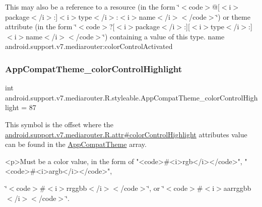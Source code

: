 This may also be a reference to a resource (in the form \char`\"{}$<$code$>$@\mbox{[}$<$i$>$package$<$/i$>$\+:\mbox{]}$<$i$>$type$<$/i$>$\+:$<$i$>$name$<$/i$>$$<$/code$>$\char`\"{}) or theme attribute (in the form \char`\"{}$<$code$>$?\mbox{[}$<$i$>$package$<$/i$>$\+:\mbox{]}\mbox{[}$<$i$>$type$<$/i$>$\+:\mbox{]}$<$i$>$name$<$/i$>$$<$/code$>$\char`\"{}) containing a value of this type.  name android.\+support.\+v7.\+mediarouter\+:color\+Control\+Activated \mbox{\label{classandroid_1_1support_1_1v7_1_1mediarouter_1_1R_1_1styleable_a3101d4c220b1624630e177adbcb5bed1}} 
\subsubsection{\texorpdfstring{App\+Compat\+Theme\+\_\+color\+Control\+Highlight}{AppCompatTheme\_colorControlHighlight}}
{\footnotesize\ttfamily int android.\+support.\+v7.\+mediarouter.\+R.\+styleable.\+App\+Compat\+Theme\+\_\+color\+Control\+Highlight = 87\hspace{0.3cm}{\ttfamily [static]}}

This symbol is the offset where the \hyperlink{classandroid_1_1support_1_1v7_1_1mediarouter_1_1R_1_1attr_abb07fa9a5eea7ae936cbd535a850d6e4}{android.\+support.\+v7.\+mediarouter.\+R.\+attr\#color\+Control\+Highlight} attribute\textquotesingle{}s value can be found in the \hyperlink{classandroid_1_1support_1_1v7_1_1mediarouter_1_1R_1_1styleable_a4e3d3900c75d49aeb2f283cac00214d6}{App\+Compat\+Theme} array.

\begin{DoxyVerb}      <p>Must be a color value, in the form of "<code>#<i>rgb</i></code>", "<code>#<i>argb</i></code>",
\end{DoxyVerb}
 \char`\"{}$<$code$>$\#$<$i$>$rrggbb$<$/i$>$$<$/code$>$\char`\"{}, or \char`\"{}$<$code$>$\#$<$i$>$aarrggbb$<$/i$>$$<$/code$>$\char`\"{}. 

